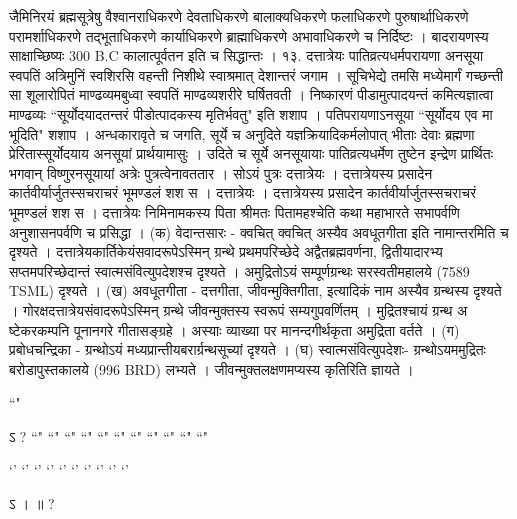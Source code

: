 जैमिनिरयं ब्रह्मसूत्रेषु वैश्वानराधिकरणे देवताधिकरणे बालाक्यधिकरणे फलाधिकरणे पुरुषार्थाधिकरणे परामर्शाधिकरणे तद्भूताधिकरणे कार्याधिकरणे ब्राह्माधिकरणे अभावाधिकरणे च निर्दिष्टः । बादरायणस्य साक्षाच्छिष्यः 300 B.C कालात्पूर्वतन इति च सिद्धान्तः ।
१३. दत्तात्रेयः
पातिव्रत्यधर्मपरायणा अनसूया स्वपतिं अत्रिमुनिं स्वशिरसि वहन्ती निशीथे स्वाश्रमात् देशान्तरं जगाम । सूचिभेद्ये तमसि मध्येमार्गं गच्छन्ती सा शूलारोपितं माण्ढव्यमबुध्वा स्वपतिं माण्ढव्यशरीरे घर्षितवती । निष्कारणं पीडामुत्पादयन्तं कमित्यज्ञात्वा माण्ढव्यः ``सूर्योदयादतन्तरं पीडोत्पादकस्य मृतिर्भवतु" इति शशाप । पतिपरायणाऽनसूया ``सूर्योदय एव मा भूदिति" शशाप । अन्धकारावृते च जगति, सूर्ये च अनुदिते यज्ञक्रियादिकर्मलोपात् भीताः देवाः ब्रह्मणा प्रेरितास्सूर्योदयाय अनसूयां प्रार्थयामासुः । उदिते च सूर्ये अनसूयायाः पातिव्रत्यधर्मेण तुष्टेन इन्द्रेण प्रार्थितः भगवान् विष्णुरनसूयायां अत्रेः पुत्रत्वेनावततार । सोऽयं पुत्रः दत्तात्रेयः । दत्तात्रेयस्य प्रसादेन कार्तवीर्यार्जुतस्सचराचरं भूमण्डलं शश स । दत्तात्रेयः । दत्तात्रेयस्य प्रसादेन कार्तवीर्यार्जुतस्सचराचरं भूमण्डलं शश स । दत्तात्रेयः निमिनामकस्य पिता श्रीमतः पितामहश्चेति कथा महाभारते सभापर्वणि अनुशासनपर्वणि च प्रसिद्धा ।
(क) वेदान्तसारः -
क्वचित् क्वचित् अस्यैव अवधूतगीता इति नामान्तरमिति च दृश्यते । दत्तात्रेयकार्तिकेयंसवादरूपेऽस्मिन् ग्रन्थे प्रथमपरिच्छेदे अद्वैतब्रह्मवर्णना, द्वितीयादारभ्य सप्तमपरिच्छेदान्तं स्वात्मसंवित्युपदेशश्च दृश्यते । अमुद्रितोऽयं सम्पूर्णग्रन्थः सरस्वतीमहालये (7589 TSML) दृश्यते ।
(ख) अवधूतगीता -
दत्तगीता, जीवन्मुक्तिगीता, इत्यादिकं नाम अस्यैव ग्रन्थस्य दृश्यते । गोरक्षदत्तात्रेयसंवादरूपेऽस्मिन् ग्रन्थे जीवन्मुक्तस्य स्वरूपं सम्यगुपवर्णितम् । मुद्रितश्चायं ग्रन्थ अ ष्टेकरकम्पनि पूनानगरे गीतासङ्ग्रहे । अस्याः व्याख्या पर मानन्दगीर्थकृता अमुद्रिता वर्तते ।
(ग) प्रबोधचन्द्रिका -
ग्रन्थोऽयं मध्यप्रान्तीयबरार्ग्रन्थसूच्यां दृश्यते ।
(घ) स्वात्मसंवित्युपदेशः-
ग्रन्थोऽयममुद्रितः बरोडापुस्तकालये (996 BRD) लभ्यते । जीवन्मुक्तलक्षणमप्यस्य कृतिरिति ज्ञायते ।


  ``"



ऽ  ?
``" ``" ``" ``" ``" ``" ``" ``" ``" ``" ``"

`' `' `' `' `' `' `' `' `' `' 

ऽ  ।   ॥ ?
